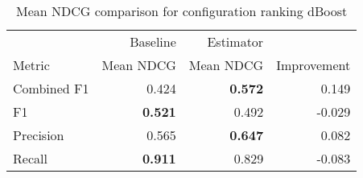 \begin{table}[H]
\centering
\caption{Mean NDCG comparison for configuration ranking dBoost}
\begin{tabular}{lrrr}
\toprule
{} &  Baseline &  Estimator &   \\
Metric          & Mean NDCG  &  Mean NDCG  &       Improvement       \\
\midrule
Combined F1 &               0.424 &                \textbf{0.572} &        0.149 \\
F1       &               \textbf{0.521} &                0.492 &       -0.029 \\
Precision     &               0.565 &                \textbf{0.647} &        0.082 \\
Recall      &               \textbf{0.911} &                0.829 &       -0.083 \\
\bottomrule
\end{tabular}
\end{table}